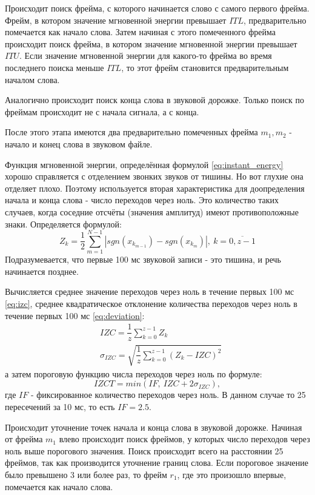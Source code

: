 Происходит поиск фрейма, с которого начинается слово с самого первого фрейма. Фрейм, в котором значение мгновенной энергии превышает $ITL$, предварительно помечается как начало слова. Затем начиная с этого помеченного фрейма происходит поиск фрейма, в котором значение мгновенной энергии превышает $ITU$. Если значение мгновенной энергии для какого-то фрейма во время последнего поиска меньше $ITL$, то этот фрейм становится предварительным началом слова. 

Аналогично происходит поиск конца слова в звуковой дорожке. Только поиск по фреймам происходит не с начала сигнала, а с конца.

После этого этапа имеются два предварительно помеченных фрейма $m_1, m_2$  - начало и конец слова в звуковом файле.

Функция мгновенной энергии, определённая формулой \eqref{eq:instant_energy} хорошо справляется с отделением звонких звуков от тишины. Но вот глухие она отделяет плохо. Поэтому используется вторая характеристика для доопределения начала и конца слова - число переходов через ноль. Это количество таких случаев, когда соседние отсчёты (значения амплитуд) имеют противоположные знаки. Определяется формулой:
\begin{equation}
	Z_k = \dfrac{1}{2} \sum_{m=1}^{N-1} |sgn(x_{k_{m-1}}) - sgn(x_{k_m})|,~k=\overline{0,z-1}
\end{equation}
Подразумевается, что первые 100 мс звуковой записи - это тишина, и речь начинается позднее.

Вычисляется среднее значение переходов через ноль в течение первых 100 мс \eqref{eq:izc},  среднее квадратическое отклонение количества переходов через ноль в течение первых 100 мс \eqref{eq:deviation}:
\begin{align}
	\label{eq:izc}
	&IZC = \dfrac{1}{z} \sum_{k=0}^{z-1} Z_k \\
	\label{eq:deviation}
	&\sigma_{IZC} = \sqrt{\dfrac{1}{z} \sum_{k=0}^{z-1} (Z_k - IZC)^2}
\end{align}
а затем пороговую функцию числа переходов через ноль по формуле:
\begin{equation}
	IZCT = min(IF,~IZC + 2 \sigma_{IZC}),
\end{equation}
где $IF$ - фиксированное количество переходов через ноль. В данном случае 
то 25 пересечений за 10 мс, то есть $IF=2.5$. 

Происходит уточнение точек начала и конца слова в звуковой дорожке. Начиная от фрейма $m_1$ влево происходит поиск фреймов, у которых число переходов через ноль выше порогового значения. Поиск происходит всего на расстоянии 25 фреймов, так как производится уточнение границ слова. Если пороговое значение было превышено 3 или более раз, то фрейм $r_1$, где это произошло впервые, помечается как начало слова.

